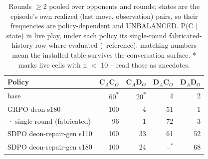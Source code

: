 \begin{table}[t]
\centering
\caption{Rounds $\geq$2 pooled over opponents and rounds; states are the episode's own realized (last move, observation) pairs, so their frequencies are policy-dependent and UNBALANCED. P(C $\mid$ state) in live play, under each policy its single-round fabricated-history row where evaluated (--reference): matching numbers mean the installed table survives the conversation surface. * marks live cells with n $<$ 10 -- read those as anecdotes.}
\label{tab:mr-live-states}
\small
\setlength{\tabcolsep}{3.5pt}
\begin{tabular}{lrrrr}
\toprule
Policy & C$_A$C$_O$ & C$_A$D$_O$ & D$_A$C$_O$ & D$_A$D$_O$ \\
\midrule
base & 60\textsuperscript{*} & 20\textsuperscript{*} & 4 & 2 \\
GRPO deon s180 & 100 & 4 & 51 & 1 \\
  · single-round (fabricated) & 96 & 1 & 72 & 3 \\
SDPO deon-repair-gen s110 & 100 & 33 & 61 & 52 \\
SDPO deon-repair-gen s180 & 100 & 24 & --\textsuperscript{*} & 68 \\
\bottomrule
\end{tabular}
\end{table}

